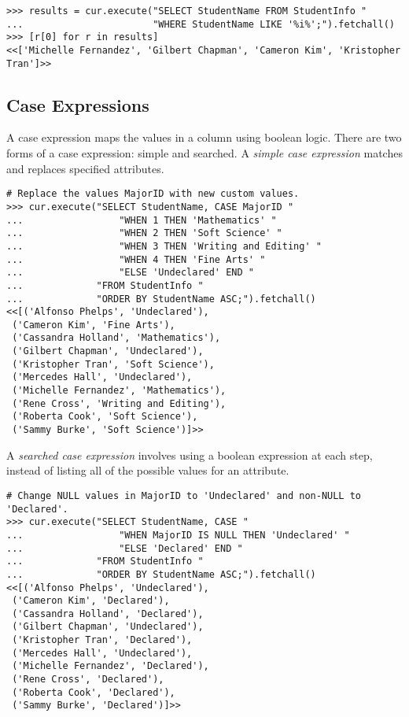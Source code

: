 \begin{lstlisting}
>>> results = cur.execute("SELECT StudentName FROM StudentInfo "
...                       "WHERE StudentName LIKE '%i%';").fetchall()
>>> [r[0] for r in results]
<<['Michelle Fernandez', 'Gilbert Chapman', 'Cameron Kim', 'Kristopher Tran']>>
\end{lstlisting}


\subsection*{Case Expressions} %

A case expression maps the values in a column using boolean logic.
There are two forms of a case expression: simple and searched.
A \emph{simple case expression} matches and replaces specified attributes.

\begin{lstlisting}
# Replace the values MajorID with new custom values.
>>> cur.execute("SELECT StudentName, CASE MajorID "
...                 "WHEN 1 THEN 'Mathematics' "
...                 "WHEN 2 THEN 'Soft Science' "
...                 "WHEN 3 THEN 'Writing and Editing' "
...                 "WHEN 4 THEN 'Fine Arts' "
...                 "ELSE 'Undeclared' END "
...             "FROM StudentInfo "
...             "ORDER BY StudentName ASC;").fetchall()
<<[('Alfonso Phelps', 'Undeclared'),
 ('Cameron Kim', 'Fine Arts'),
 ('Cassandra Holland', 'Mathematics'),
 ('Gilbert Chapman', 'Undeclared'),
 ('Kristopher Tran', 'Soft Science'),
 ('Mercedes Hall', 'Undeclared'),
 ('Michelle Fernandez', 'Mathematics'),
 ('Rene Cross', 'Writing and Editing'),
 ('Roberta Cook', 'Soft Science'),
 ('Sammy Burke', 'Soft Science')]>>
\end{lstlisting}

A \emph{searched case expression} involves using a boolean expression at each step, instead of listing all of the possible values for an attribute.

\begin{lstlisting}
# Change NULL values in MajorID to 'Undeclared' and non-NULL to 'Declared'.
>>> cur.execute("SELECT StudentName, CASE "
...                 "WHEN MajorID IS NULL THEN 'Undeclared' "
...                 "ELSE 'Declared' END "
...             "FROM StudentInfo "
...             "ORDER BY StudentName ASC;").fetchall()
<<[('Alfonso Phelps', 'Undeclared'),
 ('Cameron Kim', 'Declared'),
 ('Cassandra Holland', 'Declared'),
 ('Gilbert Chapman', 'Undeclared'),
 ('Kristopher Tran', 'Declared'),
 ('Mercedes Hall', 'Undeclared'),
 ('Michelle Fernandez', 'Declared'),
 ('Rene Cross', 'Declared'),
 ('Roberta Cook', 'Declared'),
 ('Sammy Burke', 'Declared')]>>
\end{lstlisting}

